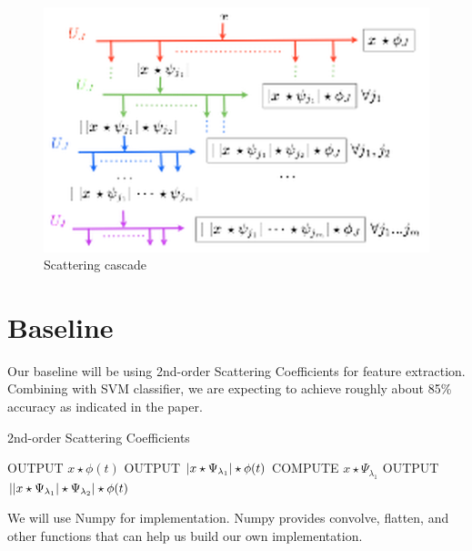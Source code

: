 \documentclass[final]{siamltexmm}
\begin{document}
\begin{figure}[ht]
\begin{center}
  \includegraphics[scale=0.5]{Figure3.png}
  \caption{Scattering cascade}
\end{center}
\end{figure}

\section{Baseline}
Our baseline will be using 2nd-order Scattering Coefficients for feature extraction.  Combining with SVM classifier, we are expecting to achieve roughly about 85\% accuracy as indicated in the paper.
\begin{algorithm}[htb]
  \caption{2nd-order Scattering Coefficients}
  \label{algo:SC}
\begin{algorithmic}[1]
      \STATE OUTPUT $x \star \phi(t)$
      \STATE
          \STATE OUTPUT $\arrowvert x \star \Psi_{\lambda_{1}} \arrowvert \star \phi(t)$
          \STATE COMPUTE $x \star \Psi_{\lambda_{1}}$
          \STATE
              OUTPUT $\arrowvert \arrowvert x \star \Psi_{\lambda_{1}} \arrowvert \star \Psi_{\lambda_{2}} \arrowvert \star \phi(t)$
            \ENDFOR
        \ENDFOR
    \ENDFOR
  \ENDFOR
\end{algorithmic}
\end{algorithm}

We will use Numpy for implementation.  Numpy provides convolve, flatten, and other functions that can help us build our own implementation.
\end{document}
